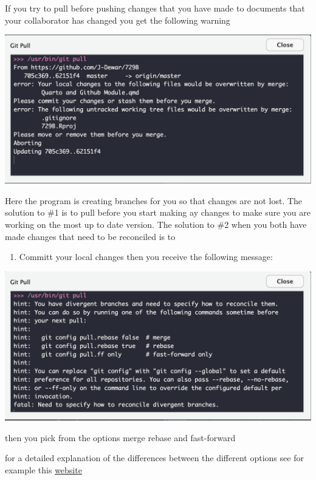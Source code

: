 \documentclass[
  letterpaper,
  DIV=11,
  numbers=noendperiod]{scrartcl}
\providecommand{\tightlist}{%
  \setlength{\itemsep}{0pt}\setlength{\parskip}{0pt}}\usepackage{longtable,booktabs,array}
\begin{document}
If you try to pull before pushing changes that you have made to
documents that your collaborator has changed you get the following
warning

\includegraphics{figures/35.png}

Here the program is creating branches for you so that changes are not
lost. The solution to \#1 is to pull before you start making ay changes
to make sure you are working on the most up to date version. The
solution to \#2 when you both have made changes that need to be
reconciled is to

\begin{enumerate}
\def\labelenumi{\alph{enumi})}
\tightlist
\item
  Committ your local changes then you receive the following message:
\end{enumerate}

\includegraphics{figures/36.png}

then you pick from the options merge rebase and fast-forward

for a detailed explanation of the differences between the different
options see for example this
\href{https://frontend.turing.edu/lessons/module-3/merge-vs-rebase.html?ads_cmpid=6451354298\&ads_adid=76255849919\&ads_matchtype=\&ads_network=g\&ads_creative=517671727591\&utm_term=\&ads_targetid=dsa-19959388920\&utm_campaign=\&utm_source=adwords\&utm_medium=ppc\&ttv=2\&gclid=CjwKCAiAoL6eBhA3EiwAXDom5hB7rNI86O5HQq3UFkG9tY7t8uBDicj5fL9lc9K_JCyjvZYKz-Wm-RoC97kQAvD_BwE}{website}
\end{document}
